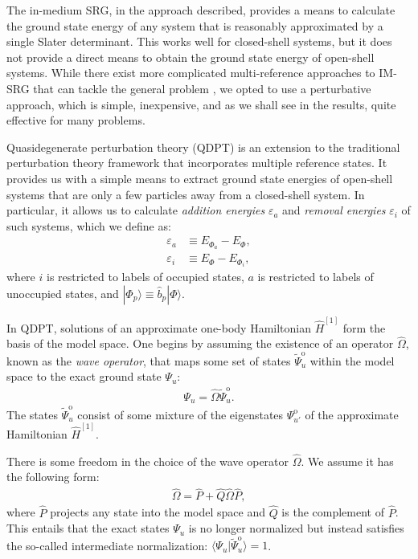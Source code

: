 The in-medium SRG, in the approach described, provides a means to calculate the ground state energy of any system that is reasonably approximated by a single Slater determinant.  This works well for closed-shell systems, but it does not provide a direct means to obtain the ground state energy of open-shell systems.  While there exist more complicated multi-reference approaches to IM-SRG that can tackle the general problem \cite{Hergert2016165}, we opted to use a perturbative approach, which is simple, inexpensive, and as we shall see in the results, quite effective for many problems.

Quasidegenerate perturbation theory (QDPT) is an extension to the traditional perturbation theory framework that incorporates multiple reference states.  It provides us with a simple means to extract ground state energies of open-shell systems that are only a few particles away from a closed-shell system.  In particular, it allows us to calculate \textit{addition energies} $\varepsilon_a$ and \textit{removal energies} $\varepsilon_i$ of such systems, which we define as:
\begin{align}
  \varepsilon_a &\equiv E_{\Phi_a} - E_{\Phi}, \\
  \varepsilon_i &\equiv E_{\Phi} - E_{\Phi_i},
\end{align}
where $i$ is restricted to labels of occupied states, $a$ is restricted to labels of unoccupied states, and $|\Phi_p\rangle \equiv \hat b_p |\Phi\rangle$.

In QDPT, solutions of an approximate one-body Hamiltonian $\hat{H}^{[1]}$ form the basis of the model space.  One begins by assuming the existence of an operator $\hat{\Omega}$, known as the \textit{wave operator}, that maps some set of states $\tilde \Psi^{\mathrm{o}}_u$ within the model space to the exact ground state $\Psi_u$:
\begin{align} \label{eq:omega-condition1}
  \Psi_u = \hat \Omega \tilde \Psi^{\mathrm{o}}_u.
\end{align}
The states $\tilde \Psi^{\mathrm{o}}_u$ consist of some mixture of the eigenstates $\Psi^{\mathrm{o}}_{u'}$ of the approximate Hamiltonian $\hat{H}^{[1]}$.

There is some freedom in the choice of the wave operator $\hat \Omega$.  We assume it has the following form:
\begin{align} \label{eq:omega-condition2}
  \hat \Omega = \hat P + \hat Q \hat \Omega \hat P,
\end{align}
where $\hat P$ projects any state into the model space and $\hat Q$ is the complement of $\hat P$.  This entails that the exact states $\Psi_u$ is no longer normalized but instead satisfies the so-called intermediate normalization: $\langle \Psi_u | \tilde \Psi^{\mathrm{o}}_u \rangle = 1$.

